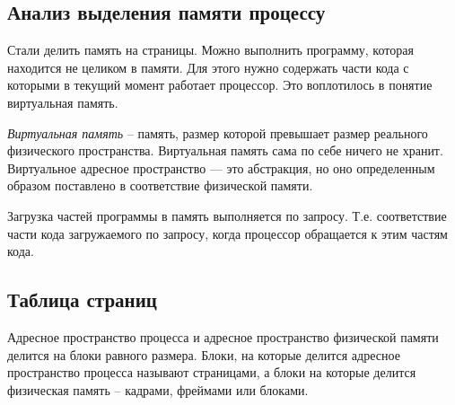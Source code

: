 

\subsection{Анализ выделения памяти процессу}

Стали делить память на страницы. Можно выполнить программу, которая находится не целиком в памяти. 
Для этого нужно содержать части кода с которыми в текущий момент работает процессор.
Это воплотилось в понятие виртуальная память.

\textit{Виртуальная память} – память, размер которой превышает размер реального физического пространства.
Виртуальная память сама по себе ничего не хранит. 
Виртуальное адресное пространство — это абстракция, но оно определенным образом поставлено в соответствие физической памяти.

Загрузка частей программы в память выполняется по запросу. 
Т.е. соответствие части кода загружаемого по запросу, когда процессор обращается к этим частям кода.

\subsection{Таблица страниц}

Адресное пространство процесса и адресное пространство физической памяти делится на блоки равного размера. Блоки, на которые делится адресное пространство процесса называют страницами, а блоки на которые делится физическая память – кадрами, фреймами или блоками.

